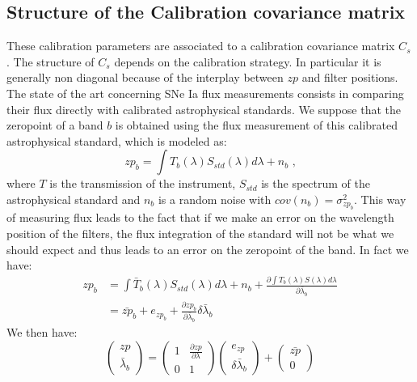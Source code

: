 \documentclass[\docopts]{\docclass}
\begin{document}
\subsection{Structure of the Calibration covariance matrix}
\label{subsec::covmat}
These calibration parameters are associated to a calibration covariance matrix $C_s$.
The structure of $C_s$ depends on the calibration strategy. In particular it is generally non diagonal because of the interplay between $zp$ and filter positions.
The state of the art concerning SNe Ia flux measurements consists in comparing their flux directly with calibrated astrophysical standards.
We suppose that the zeropoint of a band $b$ is obtained using the flux measurement of this calibrated astrophysical standard, which is modeled as:
\begin{equation}
zp_b = \int T_b(\lambda) S_{std}(\lambda) d\lambda + n_b \text{ ,}
\end{equation}
where $T$ is the transmission of the instrument, $S_{std}$ is the spectrum of the astrophysical standard and $n_b$ is a random noise with $cov(n_b) = \sigma_{zp_b}^2$.
This way of measuring flux leads to the fact that if we make an error on the wavelength position of the filters, the flux integration of the standard will not be what we should expect and thus leads to an error on the zeropoint of the band.
In fact we have:
\begin{equation}
\begin{split}
zp_b &= \int \bar T_b(\lambda) S_{std}(\lambda) d\lambda + n_b + \frac{\partial \int{T_b(\lambda)S(\lambda)d\lambda}}{\partial \bar\lambda_b }\\
&= \bar{zp}_b + e_{zp_b} + \frac{\partial zp_b}{\partial \bar\lambda_b }\delta\bar\lambda_b 
\end{split}
\end{equation}
We then have:
\begin{equation}
\begin{pmatrix}
  zp \\
  \bar\lambda_b 
\end{pmatrix}
=
\begin{pmatrix}
  1 & \frac{\partial zp}{\partial \lambda} \\
  0 & 1
\end{pmatrix}
\begin{pmatrix}
  e_{zp} \\
  \delta\bar\lambda_b 
\end{pmatrix}
+
\begin{pmatrix}
  \bar{zp} \\
  0
\end{pmatrix}
\end{equation}
\end{document}
